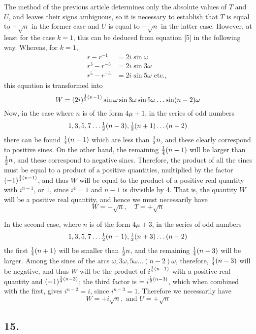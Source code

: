 \documentclass[twoside,12pt]{memoir}
\let\oldfrac\frac
\def\frac#1#2{\mathchoice{\tfrac{#1}{#2}}{\oldfrac{#1}{#2}}{\genfrac{}{}{}{2}{#1}{#2\mathstrut}}{\genfrac{}{}{}{3}{#1}{#2\mathstrut}}}
\begin{document}
The method of the previous article determines only the absolute values of \(T\) and \(U\), and leaves their signs ambiguous, so it is necessary to establish that \(T\) is equal to \(+\sqrt{n}\) in the former case and \(U\) is equal to \(-\sqrt{n}\) in the latter case. However, at least for the case \(k=1\), this can be deduced from equation [5] in the following way.  Whereas, for \(k=1\),
\[\begin{aligned}
r-r^{-1} & =2 i \sin \omega \\
r^{3}-r^{-3} & =2 i \sin 3 \omega \\
r^{5}-r^{-5} & =2 i \sin 5 \omega \text{ etc{.}, }
\end{aligned}\]
this equation is transformed into
\[W=(2 i)^{\frac{1}{2}(n-1)} \sin \omega \sin 3 \omega \sin 5 \omega \ldots \sin (n-2) \omega\]
Now, in the case where \(n\) is of the form \(4 \mu+1\), in the series of odd numbers
\[1,3,5,7 \ldots \frac{1}{2}(n-3), \frac{1}{2}(n+1) \ldots(n-2)\]
there can be found \(\frac{1}{4}(n-1)\) which are less than \(\frac{1}{2} n\), and these clearly correspond to positive sines. On the other hand, the remaining \(\frac{1}{4}(n-1)\) will be larger than \(\frac{1}{2} n\), and these correspond to negative sines. Therefore, the product of all the sines must be equal to a product of a positive quantities, multiplied by the factor \((-1)^{\frac{1}{4}(n-1)}\), and thus \(W\) will be equal to the product of a positive real quantity with \(i^{n-1}\), or \(1\), since \(i^{4}=1\) and \(n-1\) is divisible by 4. That is, the quantity \(W\) will be a positive real quantity, and hence we must necessarily have
\[W=+\sqrt{n}, \quad T=+\sqrt{n}\]

In the second case, where \(n\) is of the form \(4 \mu+3\), in the series of odd numbers
\[1,3,5,7 \ldots \frac{1}{2}(n-1), \frac{1}{2}(n+3) \ldots(n-2)\]
the first \(\frac{1}{4}(n+1)\) will be smaller than \(\frac{1}{2} n\), and the remaining \(\frac{1}{4}(n-3)\) will be larger. Among the sines of the arcs \(\omega, 3 \omega, 5 \omega \ldots(n-2) \omega\), therefore, \(\frac{1}{4}(n-3)\) will be negative, and thus \(W\) will be the product of \(i^{\frac{1}{2}(n-1)}\) with a positive real quantity and \((-1)^{\frac{1}{4}(n-3)}\); the third factor is \(=i^{\frac{1}{2}(n-3)}\), which when combined with the first, gives \(i^{n-2}=i\), since \(i^{n-3}=1\). Therefore we necessarily have
\[W=+i \sqrt{n}, \text{ and } U=+\sqrt{n}\]
%

\subsection*{15.}
\end{document}
